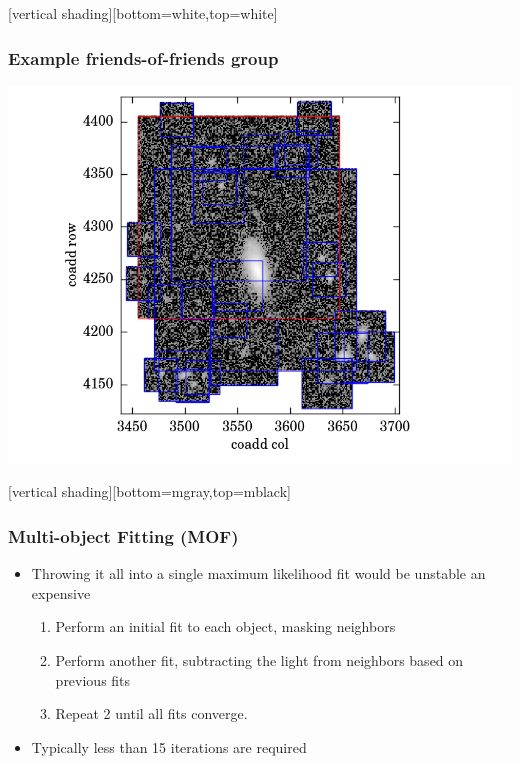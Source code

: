 \documentclass{beamer}
\begin{document}
{
    [vertical shading][bottom=white,top=white]
    \frame
    {
        \frametitle{Example friends-of-friends group}

     
        \begin{center}
            \includegraphics[width=\textwidth]{fof-001.png}
            \newline
        \end{center}


    }
    [vertical shading][bottom=mgray,top=mblack]
}


\frame
{
    \frametitle{Multi-object Fitting (MOF)}

 
    \begin{itemize}

        \item Throwing it all into a single maximum likelihood fit would be unstable
            an expensive

        \begin{enumerate}
            \item Perform an initial fit to each object, masking neighbors

            \item Perform another fit, subtracting the light from neighbors based
                on previous fits

            \item Repeat 2 until all fits converge.
        \end{enumerate}

        \item Typically less than 15 iterations are required


    \end{itemize}

}
\end{document}
